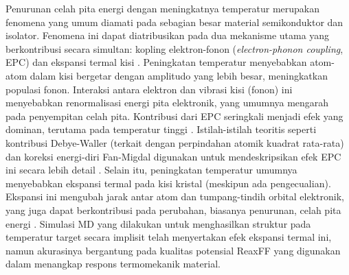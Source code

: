 Penurunan celah pita energi dengan meningkatnya temperatur merupakan fenomena yang umum diamati pada sebagian besar material semikonduktor dan isolator. Fenomena ini dapat diatribusikan pada dua mekanisme utama yang berkontribusi secara simultan: kopling elektron-fonon (\textit{electron-phonon coupling}, EPC) dan ekspansi termal kisi \cite{[1, 1, 1], Peng2012}. Peningkatan temperatur menyebabkan atom-atom dalam kisi bergetar dengan amplitudo yang lebih besar, meningkatkan populasi fonon. Interaksi antara elektron dan vibrasi kisi (fonon) ini menyebabkan renormalisasi energi pita elektronik, yang umumnya mengarah pada penyempitan celah pita. Kontribusi dari EPC seringkali menjadi efek yang dominan, terutama pada temperatur tinggi \cite{[1]}. Istilah-istilah teoritis seperti kontribusi Debye-Waller (terkait dengan perpindahan atomik kuadrat rata-rata) dan koreksi energi-diri Fan-Migdal digunakan untuk mendeskripsikan efek EPC ini secara lebih detail \cite{[1]}. Selain itu, peningkatan temperatur umumnya menyebabkan ekspansi termal pada kisi kristal (meskipun ada pengecualian). Ekspansi ini mengubah jarak antar atom dan tumpang-tindih orbital elektronik, yang juga dapat berkontribusi pada perubahan, biasanya penurunan, celah pita energi \cite{[1]}. Simulasi MD yang dilakukan untuk menghasilkan struktur pada temperatur target secara implisit telah menyertakan efek ekspansi termal ini, namun akurasinya bergantung pada kualitas potensial ReaxFF yang digunakan dalam menangkap respons termomekanik material.

